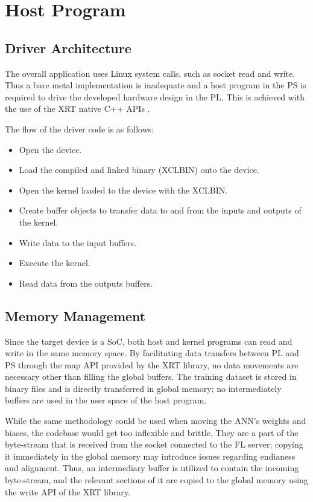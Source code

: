 \section{Host Program}

\subsection{Driver Architecture}
The overall application uses Linux system calls, such as socket read and write. Thus a bare metal implementation is inadequate and a host program in the PS is required to drive the developed hardware design in the PL. This is achieved with the use of the XRT native C++ APIs \cite{XRT_Native_APIs}.

The flow of the driver code is as follows:
\begin{itemize}
    \item Open the device.
    \item Load the compiled and linked binary (XCLBIN) onto the device.
    \item Open the kernel loaded to the device with the XCLBIN.
    \item Create buffer objects to transfer data to and from the inputs and outputs of the kernel.
    \item Write data to the input buffers.
    \item Execute the kernel.
    \item Read data from the outputs buffers.
\end{itemize}

\subsection{Memory Management}
Since the target device is a SoC, both host and kernel programs can read and write in the same memory space. By facilitating data transfers between PL and PS through the map API provided by the XRT library, no data movements are necessary other than filling the global buffers. The training dataset is stored in binary files and is directly transferred in global memory; no intermediately buffers are used in the user space of the host program. %

While the same methodology could be used when moving the ANN's weights and biases, the codebase would get too inflexible and brittle. They are a part of the byte-stream that is received from the socket connected to the FL server; copying it immediately in the global memory may introduce issues regarding endianess and alignment. Thus, an intermediary buffer is utilized to contain the incoming byte-stream, and the relevant sections of it are copied to the global memory using the write API of the XRT library. %

